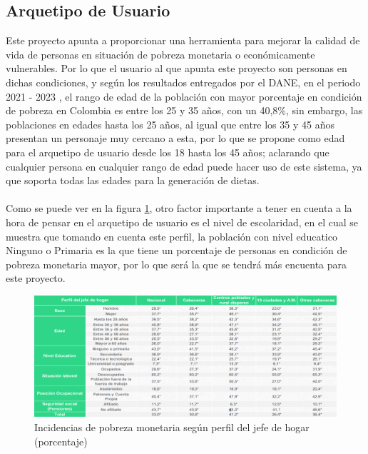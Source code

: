 \subsection{Arquetipo de Usuario}

\noindent Este proyecto apunta a proporcionar una herramienta para mejorar la calidad de vida de personas en situaci\'on de pobreza monetaria o econ\'omicamente vulnerables. Por lo que el usuario al que apunta este proyecto son personas en dichas condiciones, y seg\'un los resultados entregados por el DANE, en el periodo 2021 - 2023 \cite{pobrezaDane}, el rango de edad de la poblaci\'on con mayor porcentaje en condici\'on de pobreza en Colombia es entre los 25 y 35 a\~{n}os, con un 40,8\%, sin embargo, las poblaciones en edades hasta los 25 a\~{n}os, al igual que entre los 35 y 45 a\~{n}os presentan un personaje muy cercano a esta, por lo que se propone como edad para el arquetipo de usuario desde los 18 hasta los 45 a\~{n}os; aclarando que cualquier persona en cualquier rango de edad puede hacer uso de este sistema, ya que soporta todas las edades para la generaci\'on de dietas.
\\
\\
Como se puede ver en la figura \ref{fig:pobrezaMonetaria}, otro factor importante a tener en cuenta a la hora de pensar en el arquetipo de usuario es el nivel de escolaridad, en el cual se muestra que tomando en cuenta este perfil, la poblaci\'on con nivel educatico Ninguno o Primaria es la que tiene un porcentaje de personas en condici\'on de pobreza monetaria mayor, por lo que ser\'a la que se tendr\'a m\'as encuenta para este proyecto.



\begin{figure}[H]
        \centering
        \includegraphics[width=15cm]{img/metodologia/pobrezaMonetariaColombia.png}
        \caption{Incidencias de pobreza monetaria seg\'un perfil del jefe de hogar (porcentaje)}
        \label{fig:pobrezaMonetaria}
    \end{figure}

